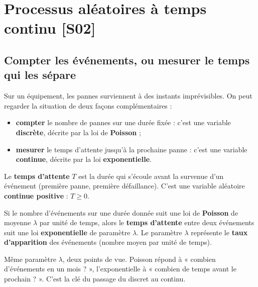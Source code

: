 \documentclass[a4paper,11pt]{article}
\begin{document}
\newpage
\tableofcontents
\newpage

\section{Processus aléatoires à temps continu \hfill {\normalsize\color{uimmred}[S02]}}

\subsection{Compter les événements, ou mesurer le temps qui les sépare}

Sur un équipement, les pannes surviennent à des instants imprévisibles. On peut regarder la situation de deux façons complémentaires :
\begin{itemize}
  \item \textbf{compter} le nombre de pannes sur une durée fixée : c'est une variable \textbf{discrète}, décrite par la loi de \textbf{Poisson} ;
  \item \textbf{mesurer} le temps d'attente jusqu'à la prochaine panne : c'est une variable \textbf{continue}, décrite par la loi \textbf{exponentielle}.
\end{itemize}

\begin{definition}
Le \textbf{temps d'attente} $T$ est la durée qui s'écoule avant la survenue d'un événement (première panne, première défaillance). C'est une variable aléatoire \textbf{continue positive} : $T \geq 0$.
\end{definition}

\begin{theoreme}
Si le nombre d'événements sur une durée donnée suit une loi de \textbf{Poisson} de moyenne $\lambda$ par unité de temps, alors le \textbf{temps d'attente} entre deux événements suit une loi \textbf{exponentielle} de paramètre $\lambda$. Le paramètre $\lambda$ représente le \textbf{taux d'apparition} des événements (nombre moyen par unité de temps).
\end{theoreme}

\begin{remarque}
Même paramètre $\lambda$, deux points de vue. Poisson répond à « combien d'événements en un mois ? », l'exponentielle à « combien de temps avant le prochain ? ». C'est la clé du passage du discret au continu.
\end{remarque}
\end{document}
